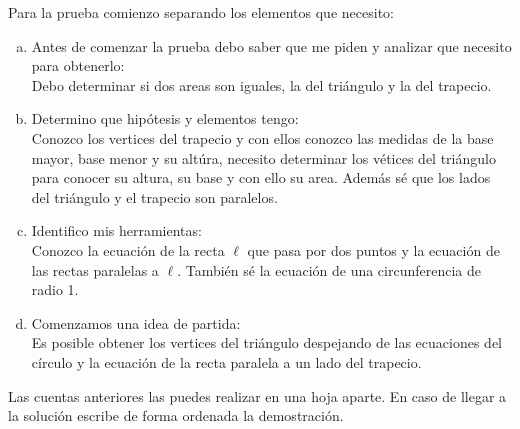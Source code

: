 Para la prueba comienzo separando los elementos que necesito:

\begin{enumerate}[a)]
  \item Antes de comenzar la prueba debo saber que me piden
    y analizar que necesito para obtenerlo:\\
    Debo determinar si dos areas son iguales,
    la del triángulo y la del trapecio.

  \item Determino que hipótesis y elementos tengo:\\
    Conozco los vertices del trapecio
    y con ellos conozco las medidas
    de la base mayor, base menor y su altúra,
    necesito determinar los vétices del triángulo para conocer su altura,
    su base y con ello su area.
    Además sé que los lados del triángulo y el trapecio son paralelos.

  \item Identifico mis herramientas:\\
    Conozco la ecuación de la recta $\ell$ que pasa por dos puntos
    y la ecuación de las rectas paralelas a $\ell.$
    También sé la ecuación de una circunferencia de radio 1.

  \item Comenzamos una idea de partida:\\
    Es posible obtener los vertices del triángulo
    despejando de las ecuaciones del círculo
    y la ecuación de la recta paralela a un lado del trapecio.

\end{enumerate}

Las cuentas anteriores las puedes realizar en una hoja aparte.
En caso de llegar a la solución escribe de forma ordenada la demostración.


